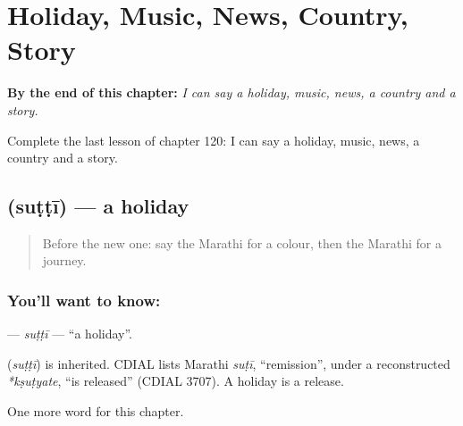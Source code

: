 
\chapter{Holiday, Music, News, Country, Story}
\label{ch:mr-holiday-music-news-country-story}

\begin{chapteropening}
\textbf{By the end of this chapter:} \emph{I can say a holiday, music, news, a country and a story.}

Complete the last lesson of chapter 120: I can say a holiday, music, news, a country and a story.
\end{chapteropening}

\section[\texorpdfstring{\mr{सुट्टी} (suṭṭī)}{सुट्टी (suṭṭī)}]{ (suṭṭī) — a holiday}

\label{lesson:MR-C120-sutti}



\begin{quote}
Before the new one: say the Marathi for a colour, then the Marathi for a journey.
\end{quote}

\subsection*{You'll want to know: }
\textbf{} — \emph{suṭṭī} — \textquotedblleft{}a holiday\textquotedblright{}.

\begin{cousinweb}
\textbf{} (\emph{suṭṭī}) is inherited. CDIAL lists Marathi \emph{suṭī}, \textquotedblleft{}remission\textquotedblright{}, under a reconstructed \emph{*kṣuṭyate}, \textquotedblleft{}is released\textquotedblright{} (CDIAL 3707). A holiday is a release.
\end{cousinweb}

\begin{grammarlens}[title={What you've built}]
One more word for this chapter.
\end{grammarlens}

